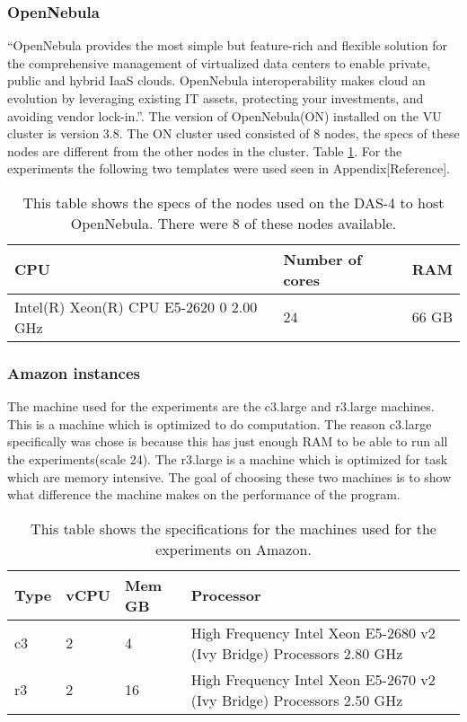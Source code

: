 \subsubsection{OpenNebula}
\label{hw:opennebula}
``OpenNebula  provides the most simple but feature-rich and flexible solution for the comprehensive management of virtualized data centers to enable private, public and hybrid IaaS clouds. OpenNebula interoperability makes cloud an evolution by leveraging existing IT assets, protecting your investments, and avoiding vendor lock-in.''\cite{opennebula}. The version of OpenNebula(ON) installed on the VU cluster is version 3.8. The ON cluster used consisted of 8 nodes, the specs of these nodes are different from the other nodes in the cluster. Table \ref{tab:specs-opennebula}. For the experiments the following two templates were used seen in Appendix[Reference].
\begin{table} [!h]
	\begin{center}
	\begin{tabular}{|l|l|l|}
		\hline
		CPU & Number of cores & RAM  \\ \hline
		Intel(R) Xeon(R) CPU E5-2620 0 2.00 GHz & 24 & 66 GB\\ \hline
	\end{tabular}
	\caption{This table shows the specs of the nodes used on the DAS-4 to host OpenNebula. There were 8 of these nodes available.}
	\label{tab:specs-opennebula}
	\end{center}
\end{table}

\subsubsection{Amazon instances}
\label{hw:Amazon}
The machine used for the experiments are the c3.large and r3.large machines. This is a machine which is optimized to do computation. The reason c3.large specifically was chose is because this has just enough RAM to be able to run all the experiments(scale 24). The r3.large is a machine which is optimized for task which are memory intensive. The goal of choosing these two machines is to show what difference the machine makes on the performance of the program.

\begin{table}[!h]
\begin{center}
\begin{tabular}{|l|l|l|l|}
\hline
Type & vCPU & Mem GB & Processor \\ \hline
c3 & 2 & 4 & High Frequency Intel Xeon E5-2680 v2 (Ivy Bridge) Processors 2.80 GHz \\ \hline
r3 & 2 & 16 & High Frequency Intel Xeon E5-2670 v2 (Ivy Bridge) Processors 2.50 GHz \\ \hline
\end{tabular}
\end{center}
\caption{This table shows  the specifications for the machines used for the experiments on Amazon.}
\label{tab:specs-amazong}
\end{table}

